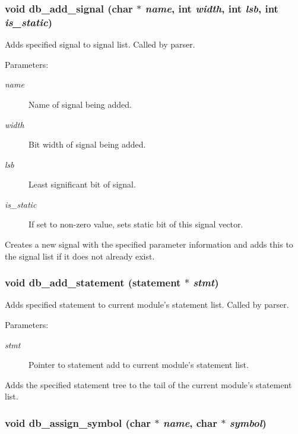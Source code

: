 \subsubsection{\setlength{\rightskip}{0pt plus 5cm}void db\_\-add\_\-signal (char $\ast$ {\em name}, int {\em width}, int {\em lsb}, int {\em is\_\-static})}\label{db_8h_a4}


Adds specified signal to signal list. Called by parser.

\begin{Desc}
\item[Parameters: ]\par
\begin{description}
\item[{\em 
name}]Name of signal being added. \item[{\em 
width}]Bit width of signal being added. \item[{\em 
lsb}]Least significant bit of signal. \item[{\em 
is\_\-static}]If set to non-zero value, sets static bit of this signal vector.\end{description}
\end{Desc}
Creates a new signal with the specified parameter information and adds this to the signal list if it does not already exist. 
\subsubsection{\setlength{\rightskip}{0pt plus 5cm}void db\_\-add\_\-statement ({\bf statement} $\ast$ {\em stmt})}\label{db_8h_a11}


Adds specified statement to current module's statement list. Called by parser.

\begin{Desc}
\item[Parameters: ]\par
\begin{description}
\item[{\em 
stmt}]Pointer to statement add to current module's statement list.\end{description}
\end{Desc}
Adds the specified statement tree to the tail of the current module's statement list. 
\subsubsection{\setlength{\rightskip}{0pt plus 5cm}void db\_\-assign\_\-symbol (char $\ast$ {\em name}, char $\ast$ {\em symbol})}\label{db_8h_a17}


